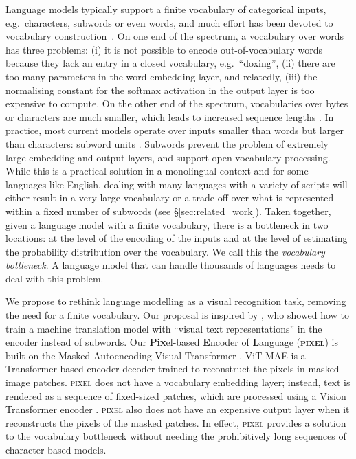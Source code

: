 \documentclass{article}
\newcommand{\model}{\textsc{pixel}\xspace}
\begin{document}
Language models typically support a finite vocabulary of categorical inputs, e.g.\ characters, subwords or even words, and much effort has been devoted to vocabulary construction~\citep{wan2022fairness}.
On one end of the spectrum, a vocabulary over words has three problems: (i) it is not possible to encode out-of-vocabulary words because they lack an entry in a closed vocabulary, e.g.\ ``doxing'', (ii) there are too many parameters in the word embedding layer, and relatedly, (iii) the normalising constant for the softmax activation in the output layer is too expensive to compute. 
On the other end of the spectrum, vocabularies over bytes or characters are much smaller, which leads to increased sequence lengths \citep{keren-etal-2022-breaking}. 
In practice, most current models operate over inputs smaller than words but larger than characters: subword units \citep{sennrich-etal-2016-neural,kudo-2018-subword}. 
Subwords prevent the problem of extremely large embedding and output layers, and support open vocabulary processing. 
While this is a practical solution in a monolingual context and for some languages like English, dealing with many languages with a variety of scripts will either result in a very large vocabulary or a trade-off over what is represented within a fixed number of subwords (see \S \ref{sec:related_work}). 
Taken together, given a language model with a finite vocabulary, there is a bottleneck in two locations: at the level of the encoding of the inputs and at the level of estimating the probability distribution over the vocabulary. 
We call this the \textit{vocabulary bottleneck}. A language model that can handle thousands of languages needs to deal with this problem.


We propose to rethink language modelling as a visual recognition task, removing the need for a finite vocabulary. 
Our proposal is inspired by \citet{salesky-etal-2021-robust}, who showed how to train a machine translation model with ``visual text representations'' in the encoder instead of subwords.
Our \textbf{Pix}el-based \textbf{E}ncoder of \textbf{L}anguage (\textbf{\model}) is built on the Masked Autoencoding Visual Transformer \citep[ViT-MAE; ][]{he-etal-2022-mae}. ViT-MAE is a Transformer-based encoder-decoder trained to reconstruct the pixels in masked image patches.
\model does not have a vocabulary embedding layer; instead, text is rendered as a sequence of fixed-sized patches, which are processed using a Vision Transformer encoder \citep{dosovitskiy2021an}.
\model also does not have an expensive output layer
when it reconstructs the pixels of the masked patches. In effect, \model provides a solution to the vocabulary bottleneck without needing the prohibitively long sequences of character-based models. 
\end{document}
